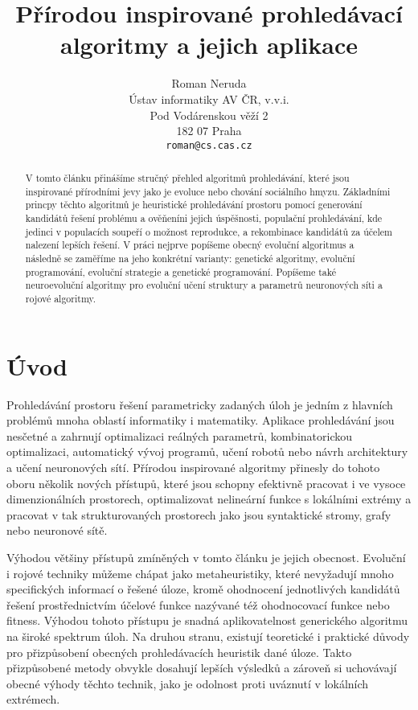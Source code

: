 \documentclass[12pt,fleqn,a4paper,proc]{article}
\title{Přírodou inspirované prohledávací algoritmy a jejich aplikace}
\author{Roman Neruda\\
Ústav informatiky AV ČR, v.v.i.\\
Pod Vodárenskou věží 2\\
182 07 Praha\\
\texttt{roman@cs.cas.cz}
}
\date{}
\begin{document}
\sloppy 
\pagestyle{empty}

\maketitle

\begin{abstract}
V tomto článku přinášíme stručný přehled algoritmů prohledávání, které jsou inspirované přírodními jevy jako je evoluce nebo chování sociálního hmyzu. Základními princpy těchto algoritmů je heuristické prohledávání prostoru pomocí generování kandidátů řešení problému a ověňeníni jejich úspěšnosti, populační prohledávání, kde jedinci v populacích soupeří o možnost reprodukce, a rekombinace kandidátů za účelem nalezení lepších řešení. V práci nejprve popíšeme obecný evoluční algoritmus a následně se zaměříme na jeho konkrétní varianty: genetické algoritmy, evoluční programování, evoluční strategie a genetické programování. Popíšeme také neuroevoluční algoritmy pro evoluční učení struktury a parametrů neuronových síti a rojové algoritmy. 
\end{abstract}

\thispagestyle{empty}

\section{Úvod}

Prohledávání prostoru řešení parametricky zadaných úloh je jedním z hlavních problémů mnoha oblastí informatiky i matematiky. Aplikace prohledávání jsou nesčetné a zahrnují optimalizaci reálných parametrů, kombinatorickou optimalizaci, automatický vývoj programů, učení robotů nebo návrh architektury a učení neuronových sítí. Přírodou inspirované algoritmy přinesly do tohoto oboru několik nových přístupů, které jsou schopny efektivně pracovat i ve vysoce dimenzionálních prostorech, optimalizovat nelineární funkce s lokálními extrémy a pracovat v tak strukturovaných prostorech jako jsou syntaktické stromy, grafy nebo neuronové sítě. 

Výhodou většiny přístupů zmíněných v tomto článku je jejich obecnost. Evoluční i rojové techniky můžeme chápat jako metaheuristiky, které nevyžadují mnoho specifických informací o řešené úloze, kromě ohodnocení jednotlivých kandidátů řešení prostřednictvím účelové funkce nazývané též ohodnocovací funkce nebo fitness. Výhodou tohoto přístupu je snadná aplikovatelnost generického algoritmu na široké spektrum úloh. Na druhou stranu, existují teoretické i praktické důvody pro přizpůsobení obecných prohledávacích heuristik dané úloze. Takto přizpůsobené metody obvykle dosahují lepších výsledků a zároveň si uchovávají obecné výhody těchto technik, jako je odolnost proti uváznutí v lokálních extrémech. 
\end{document}
